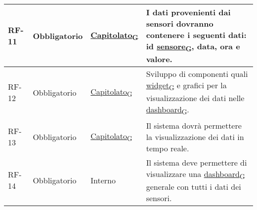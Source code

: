 \begin{longtable}{|>{\centering\arraybackslash}m{}|>{\centering\arraybackslash}m{}|>{\centering\arraybackslash}m{}|>{\centering\arraybackslash}m{}|}
	RF-11           & Obbligatorio        & \href{https://7last.github.io/docs/rtb/documentazione-interna/glossario\#capitolato}{Capitolato\textsubscript{G}} & I dati provenienti dai sensori dovranno contenere i seguenti dati: id \href{https://7last.github.io/docs/rtb/documentazione-interna/glossario\#sensore}{sensore\textsubscript{G}}, data, ora e valore.                                                                                                                                                                                                                                                                                               \\\hline
	RF-12           & Obbligatorio        & \href{https://7last.github.io/docs/rtb/documentazione-interna/glossario\#capitolato}{Capitolato\textsubscript{G}} & Sviluppo di componenti quali \href{https://7last.github.io/docs/rtb/documentazione-interna/glossario\#widget}{widget\textsubscript{G}} e grafici per la visualizzazione dei dati nelle \href{https://7last.github.io/docs/rtb/documentazione-interna/glossario\#dashboard}{dashboard\textsubscript{G}}.                                                                                                                                                                                              \\\hline
	RF-13           & Obbligatorio        & \href{https://7last.github.io/docs/rtb/documentazione-interna/glossario\#capitolato}{Capitolato\textsubscript{G}} & Il sistema dovrà permettere la visualizzazione dei dati in tempo reale.                                                                                                                                                                                                                                                                                                                                                                                                                              \\\hline
	RF-14           & Obbligatorio        & Interno                                                                                                           & Il sistema deve permettere di visualizzare una \href{https://7last.github.io/docs/rtb/documentazione-interna/glossario\#dashboard}{dashboard\textsubscript{G}} generale con tutti i dati dei sensori.                                                                                                                                                                                                                                                                                                \\\hline

\end{longtable}
